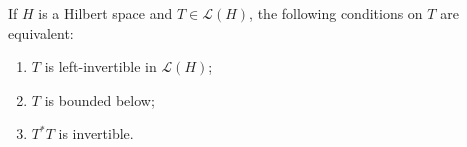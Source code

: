 If $H$ is a Hilbert space and $T \in \mathcal{L}(H)$, the following conditions on $T$ are equivalent:
\begin{enumerate}
\item[(a)] $T$ is left-invertible in $\mathcal{L}(H)$;
\item[(b)] $T$ is bounded below;
\item[(c)] $T^*T$ is invertible.
\end{enumerate}
